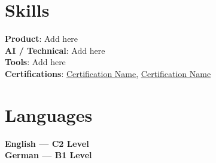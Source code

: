 \documentclass[a4,10pt]{article}
\makeatletter
\newcommand{\resumeItem}[1]{
  \item\small{
    {#1 \vspace*{1pt}}
  }
}
\newcommand{\resumeProjectHeading}[2]{
    \item
    \begin{tabular*}{0.97\textwidth}{l@{\extracolsep{\fill}}r}
      {\color{PrimaryColor}#1} & \textit{\color{AccentColor}#2} \\
    \end{tabular*}\vspace*{1pt}
}
\newcommand{\resumeSubHeadingListStart}{\begin{itemize}[leftmargin=0.15in, label={}]}
\newcommand{\resumeSubHeadingListEnd}{\end{itemize}}
\newcommand{\resumeItemListStart}{\begin{itemize}}
\newcommand{\resumeItemListEnd}{\end{itemize}\vspace*{-2pt}}
\makeatother
\begin{document}
\section{Skills}
 \begin{itemize}[leftmargin=0.15in, label={}]
    \small{\item{
     \textbf{Product}{: Add here} \vspace*{2pt} \\
     \textbf{AI / Technical}{: Add here} \vspace*{2pt} \\
     \textbf{Tools}{: Add here} \vspace*{2pt} \\
     \textbf{Certifications}{: \href{link for certification}{\underline{Certification Name}}, \href{link for certification}{\underline{Certification Name}}}
    }}
 \end{itemize}


\section{Languages}
 \begin{itemize}[leftmargin=0.15in, label={}]
    \small{\item{
          \textbf{English --- C2 Level} \vspace*{2pt} \\
          \textbf{German --- B1 Level} \vspace*{2pt} \\
    }}
 \end{itemize}

\end{document}
